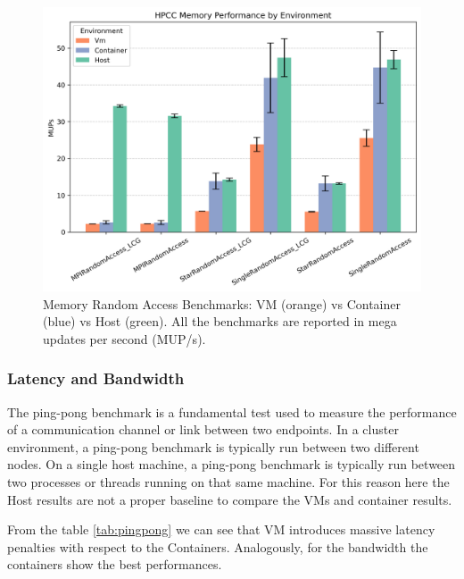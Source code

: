 \begin{figure}[htbp]
    \centering
    \includegraphics[width=0.8\linewidth]{assets/hpcc_memory_performance.png}
    \caption{Memory Random Access Benchmarks: VM (orange) vs Container (blue) vs Host (green). All the benchmarks are reported in mega updates per second (MUP/s).}
    \label{fig:hpcc_memory_performance}
\end{figure}

\subsubsection{Latency and Bandwidth}

The ping-pong benchmark is a fundamental test used to measure the performance of a communication channel or link between two endpoints. In a cluster environment, a ping-pong benchmark is typically run between two different nodes. On a single host machine, a ping-pong benchmark is typically run between two processes or threads running on that same machine. For this reason here the Host results are not a proper baseline to compare the VMs and container results.

From the table \ref{tab:pingpong} we can see that VM introduces massive latency penalties with respect to the Containers. Analogously, for the bandwidth the containers show the best performances. 

